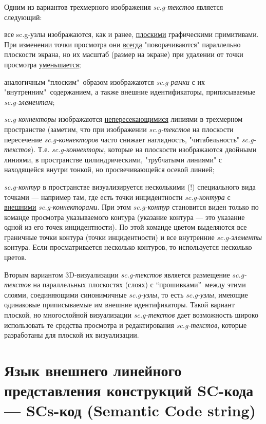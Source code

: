 Одним из вариантов трехмерного изображения \textit{sc.g-текстов} является следующий:
\begin{textitemize}
	\item все sc.g-узлы изображаются, как и ранее, \uline{плоскими} графическими примитивами. При изменении точки просмотра они \uline{всегда} "поворачиваются"{} параллельно плоскости экрана, но их масштаб (размер на экране) при удалении от точки просмотра \uline{уменьшается};
	\item аналогичным "плоским"\ образом изображаются \textit{sc.g-рамки} с их "внутренним"\ содержанием, а также внешние идентификаторы, приписываемые \textit{sc.g-элементам};
	\item \textit{sc.g-коннекторы} изображаются \uline{непересекающимися} линиями в трехмерном пространстве (заметим, что при изображении \textit{sc.g-текстов} на плоскости пересечение \textit{sc.g-коннекторов} часто снижает наглядность, "читабельность"{} \textit{sc.g-текстов}). Т.е. \textit{sc.g-коннекторы}, которые на плоскости изображаются двойными линиями, в пространстве  цилиндрическими, "трубчатыми линиями"{} с находящейся внутри тонкой, но просвечивающейся осевой линией;
	\item \textit{sc.g-контур} в пространстве визуализируется несколькими (!) специального вида точками --- например там, где есть точки инцидентности \textit{sc.g-контура} с \uline{внешними} \textit{sc.g-коннекторами}. При этом \textit{sc.g-контур} становится виден только по команде просмотра указываемого контура (указание контура --- это указание одной из его точек инцидентности). По этой команде цветом выделяются все граничные точки контура (точки инцидентности) и все внутренние \textit{sc.g-элементы} контура. Если просматривается  несколько контуров, то используется несколько цветов.
\end{textitemize}

Вторым вариантом 3D-визуализации \textit{sc.g-текстов} является размещение \textit{sc.g-текстов} на параллельных плоскостях (слоях) с “прошивками”\ между этими слоями, соединяющими синонимичные \textit{sc.g-узлы}, то есть \textit{sc.g-узлы}, имеющие одинаковые приписываемые им внешние идентификаторы. Такой вариант плоской, но многослойной визуализации \textit{sc.g-текстов} дает возможность широко использовать те средства просмотра и редактирования \textit{sc.g-текстов}, которые разработаны для плоской их визуализации.

\section{Язык внешнего линейного представления конструкций SC-кода --- SCs-код (Semantic Code string)}
\label{sec_scs}

